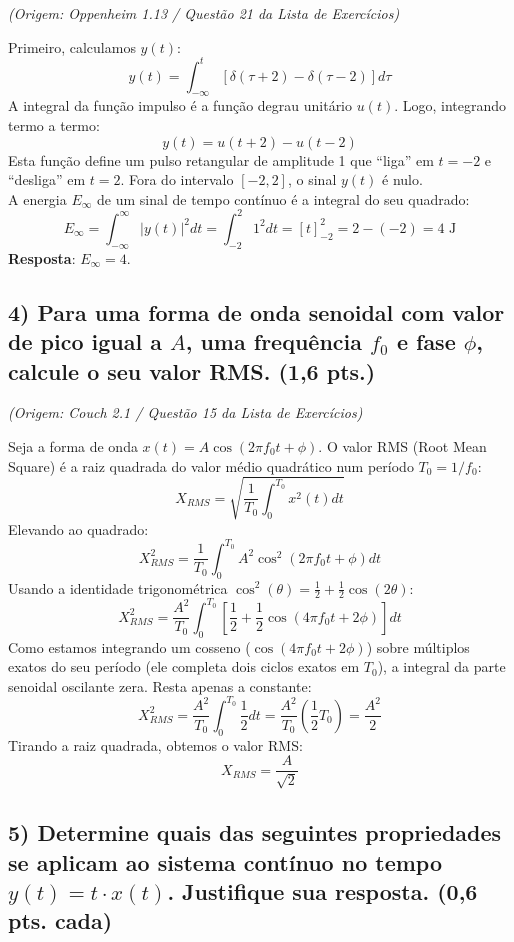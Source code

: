 \emph{(Origem: Oppenheim 1.13 / Questão 21 da Lista de Exercícios)}

Primeiro, calculamos \(y(t)\):
\[y(t) = \int_{-\infty}^{t} [\delta(\tau + 2) - \delta(\tau - 2)] d\tau\]
A integral da função impulso é a função degrau unitário \(u(t)\). Logo, integrando termo a termo:
\[y(t) = u(t + 2) - u(t - 2)\]
Esta função define um pulso retangular de amplitude 1 que ``liga'' em \(t = -2\) e ``desliga'' em \(t = 2\). Fora do intervalo \([-2, 2]\), o sinal \(y(t)\) é nulo.\\
A energia \(E_\infty\) de um sinal de tempo contínuo é a integral do seu quadrado:
\[E_\infty = \int_{-\infty}^{\infty} |y(t)|^2 dt = \int_{-2}^{2} 1^2 dt = [t]_{-2}^{2} = 2 - (-2) = 4 \text{ J}\]
\textbf{Resposta}: \(E_\infty = 4\).

\subsection{\texorpdfstring{4) Para uma forma de onda senoidal com valor de pico igual a \(A\), uma frequência \(f_0\) e fase \(\phi\), calcule o seu valor RMS. (1,6 pts.)}{4) Para uma forma de onda senoidal com valor de pico igual a…}}\label{para-uma-forma-de-onda-senoidal-com-valor-de-pico-igual-a-a-uma-frequuxeancia-f_0-e-fase-phi-calcule-o-seu-valor-rms.-16-pts.}

\emph{(Origem: Couch 2.1 / Questão 15 da Lista de Exercícios)}

Seja a forma de onda \(x(t) = A \cos(2\pi f_0 t + \phi)\). O valor RMS (Root Mean Square) é a raiz quadrada do valor médio quadrático num período \(T_0 = 1/f_0\):
\[X_{RMS} = \sqrt{ \frac{1}{T_0} \int_{0}^{T_0} x^2(t) dt }\]
Elevando ao quadrado:
\[X_{RMS}^2 = \frac{1}{T_0} \int_{0}^{T_0} A^2 \cos^2(2\pi f_0 t + \phi) dt\]
Usando a identidade trigonométrica \(\cos^2(\theta) = \frac{1}{2} + \frac{1}{2}\cos(2\theta)\):
\[X_{RMS}^2 = \frac{A^2}{T_0} \int_{0}^{T_0} \left[ \frac{1}{2} + \frac{1}{2}\cos(4\pi f_0 t + 2\phi) \right] dt\]
Como estamos integrando um cosseno (\(\cos(4\pi f_0 t + 2\phi)\)) sobre múltiplos exatos do seu período (ele completa dois ciclos exatos em \(T_0\)), a integral da parte senoidal oscilante zera. Resta apenas a constante:
\[X_{RMS}^2 = \frac{A^2}{T_0} \int_{0}^{T_0} \frac{1}{2} dt = \frac{A^2}{T_0} \left( \frac{1}{2} T_0 \right) = \frac{A^2}{2}\]
Tirando a raiz quadrada, obtemos o valor RMS:
\[X_{RMS} = \frac{A}{\sqrt{2}}\]

\subsection{\texorpdfstring{5) Determine quais das seguintes propriedades se aplicam ao sistema contínuo no tempo \(y(t) = t \cdot x(t)\). Justifique sua resposta. (0,6 pts. cada)}{5) Determine quais das seguintes propriedades se aplicam ao sistema contínuo no tempo…}}\label{determine-quais-das-seguintes-propriedades-se-aplicam-ao-sistema-contuxednuo-no-tempo-yt-t-cdot-xt.-justifique-sua-resposta.-06-pts.-cada}

